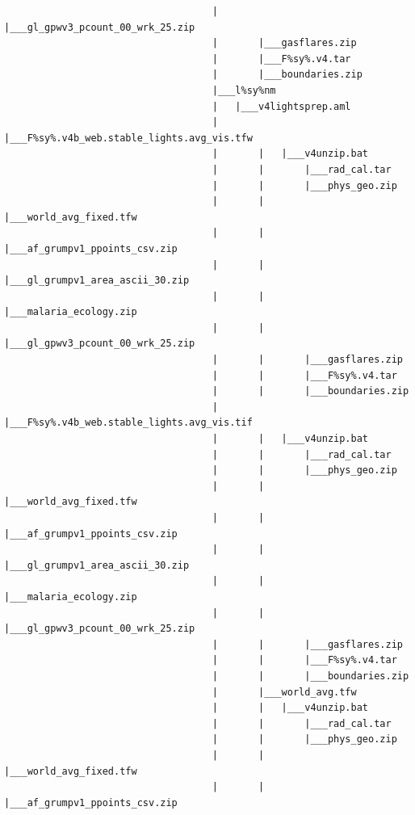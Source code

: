 \documentclass[]{book}
\begin{document}
\begin{verbatim}
                                    |       |___gl_gpwv3_pcount_00_wrk_25.zip
                                    |       |___gasflares.zip
                                    |       |___F%sy%.v4.tar
                                    |       |___boundaries.zip
                                    |___l%sy%nm
                                    |   |___v4lightsprep.aml
                                    |       |___F%sy%.v4b_web.stable_lights.avg_vis.tfw
                                    |       |   |___v4unzip.bat
                                    |       |       |___rad_cal.tar
                                    |       |       |___phys_geo.zip
                                    |       |       |___world_avg_fixed.tfw
                                    |       |       |___af_grumpv1_ppoints_csv.zip
                                    |       |       |___gl_grumpv1_area_ascii_30.zip
                                    |       |       |___malaria_ecology.zip
                                    |       |       |___gl_gpwv3_pcount_00_wrk_25.zip
                                    |       |       |___gasflares.zip
                                    |       |       |___F%sy%.v4.tar
                                    |       |       |___boundaries.zip
                                    |       |___F%sy%.v4b_web.stable_lights.avg_vis.tif
                                    |       |   |___v4unzip.bat
                                    |       |       |___rad_cal.tar
                                    |       |       |___phys_geo.zip
                                    |       |       |___world_avg_fixed.tfw
                                    |       |       |___af_grumpv1_ppoints_csv.zip
                                    |       |       |___gl_grumpv1_area_ascii_30.zip
                                    |       |       |___malaria_ecology.zip
                                    |       |       |___gl_gpwv3_pcount_00_wrk_25.zip
                                    |       |       |___gasflares.zip
                                    |       |       |___F%sy%.v4.tar
                                    |       |       |___boundaries.zip
                                    |       |___world_avg.tfw
                                    |       |   |___v4unzip.bat
                                    |       |       |___rad_cal.tar
                                    |       |       |___phys_geo.zip
                                    |       |       |___world_avg_fixed.tfw
                                    |       |       |___af_grumpv1_ppoints_csv.zip

\end{verbatim}
\end{document}
